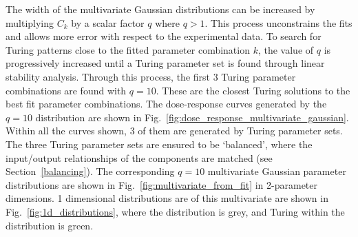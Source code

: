 The width of the multivariate Gaussian distributions can be increased by multiplying $C_k$ by a scalar factor $q$ where $q>1$.
This process unconstrains the fits and allows more error with respect to the experimental data.
To search for Turing patterns close to the fitted parameter combination $k$,
the value of $q$ is progressively increased until a Turing parameter set is found through linear stability analysis.
Through this process, the first 3 Turing parameter combinations are found with $q=10$.
These are the closest Turing solutions to the best fit parameter combinations.
The dose-response curves
generated by the $q=10$ distribution are shown in Fig.~\ref{fig:dose_response_multivariate_gaussian}.
Within all the curves shown, 3 of them are generated by Turing parameter sets.
The three Turing parameter sets are ensured to be ‘balanced’,
where the input/output relationships of the components are matched (see Section~\ref{balancing}).
The corresponding $q=10$ multivariate Gaussian parameter distributions are shown in Fig.~\ref{fig:multivariate_from_fit} in 2-parameter dimensions.
1 dimensional distributions are of this multivariate are shown in Fig.~\ref{fig:1d_distributions},
where the distribution is grey, and Turing within the distribution is green.


